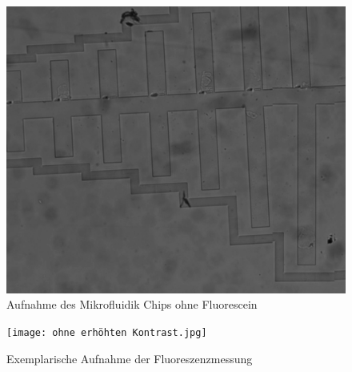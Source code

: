 \documentclass[11pt, a4paper]{article}
\begin{document}
\begin{figure}
    \centering
    \includegraphics[scale = 0.07]{normalesFoto_heller.jpg}
    \caption{Aufnahme des Mikrofluidik Chips ohne Fluorescein}
    \label{fig:MC_boring}
\end{figure}

\begin{figure}
    \centering
    \texttt{[image: ohne erhöhten Kontrast.jpg]}
    \caption{Exemplarische Aufnahme der Fluoreszenzmessung}
    \label{fig:MC_flu}
\end{figure}
\end{document}
